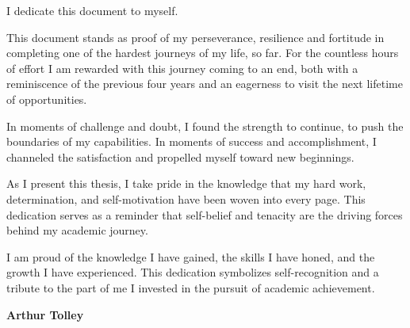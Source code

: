 I dedicate this document to myself.

\vspace{\baselineskip}

This document stands as proof of my perseverance, resilience and fortitude in completing one of the hardest journeys of my life, so far. For the countless hours of effort I am rewarded with this journey coming to an end, both with a reminiscence of the previous four years and an eagerness to visit the next lifetime of opportunities.

In moments of challenge and doubt, I found the strength to continue, to push the boundaries of my capabilities. In moments of success and accomplishment, I channeled the satisfaction and propelled myself toward new beginnings.

As I present this thesis, I take pride in the knowledge that my hard work, determination, and self-motivation have been woven into every page. This dedication serves as a reminder that self-belief and tenacity are the driving forces behind my academic journey.

I am proud of the knowledge I have gained, the skills I have honed, and the growth I have experienced. This dedication symbolizes self-recognition and a tribute to the part of me I invested in the pursuit of academic achievement.

\vspace{\baselineskip}

\textbf{Arthur Tolley}
